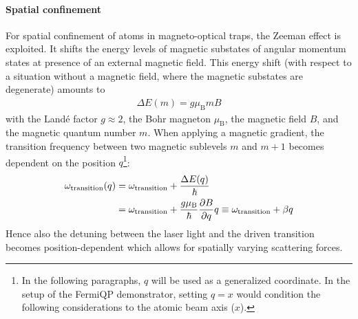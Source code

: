 \paragraph{Spatial confinement} For spatial confinement of atoms in magneto-optical traps, the Zeeman effect is exploited. It shifts the energy levels of magnetic substates of angular momentum states at presence of an external magnetic field. This energy shift (with respect to a situation without a magnetic field, where the magnetic substates are degenerate) amounts to
\begin{align}
    \Delta E(m) = g \mu_\text{B} m B
\end{align}
with the Landé factor $g \approx 2$, the Bohr magneton $\mu_\text{B}$, the magnetic field $B$, and the magnetic quantum number $m$. When applying a magnetic gradient, the transition frequency between two magnetic sublevels $m$ and $m + 1$ becomes dependent on the position $q$\footnote{In the following paragraphs, $q$ will be used as a generalized coordinate. In the setup of the FermiQP demonstrator, setting $q = x$ would condition the following considerations to the atomic beam axis ($x$).}:
\begin{equation}
    \begin{split}\label{eq:omega_transition_zeeman}
      \omega_\text{transition}(q) &= \omega_\text{transition} + \frac{\Delta E(q)}{\hbar} \\  
      &= \omega_\text{transition} + \frac{g \mu_\text{B}}{\hbar} \pdv{B}{q} q \equiv \omega_\text{transition} + \beta q
    \end{split}
\end{equation}
Hence also the detuning between the laser light and the driven transition becomes position-dependent which allows for spatially varying scattering forces.


